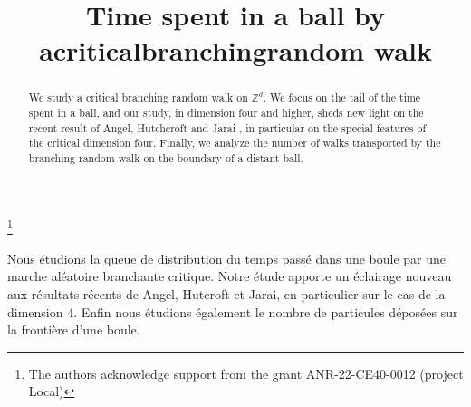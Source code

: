 \documentclass[JEP,XML,SOM,Unicode,NoFloatCountersInSection,published]{cedram}
\theoremstyle{plain}
\theoremstyle{definition}
\newcommand{\1}{{\text{\Large $\mathfrak 1$}}}
\begin{document}
\frontmatter
\title{Time spent in a ball by a\nobreakspace critical\nobreakspace branching\nobreakspace random walk}

\author[\initial{A.} \lastname{Asselah}]{ }
\address{LAMA, Univ Paris Est Créteil, Univ Gustave Eiffel, UPEM, CNRS,\\
F-94010, Créteil, France\\
\& New York University at Shanghai}

\author[\initial{B.} \lastname{Schapira}]{ }
\address{Aix-Marseille Université, I2M, CNRS UMR 7373,\\
13453 Marseille, France\\
\& Université Lyon 1, Institut Camille Jordan, CNRS UMR 5208}
\urladdr{}

\thanks{The authors acknowledge support from the grant ANR-22-CE40-0012 (project Local)}

\begin{abstract}
We study a critical branching random walk on $\mathbb{Z}^d$. We focus on the tail of the time spent in a ball, and our study, in dimension four and higher, sheds new light on the recent result of Angel, Hutchcroft and Jarai , in particular on the special features of the critical dimension four. Finally, we analyze the number of walks transported by the branching random walk on the boundary of a distant ball.
\end{abstract}





\begin{altabstract}
Nous étudions la queue de distribution du temps passé dans une boule par une marche aléatoire branchante critique. Notre étude apporte un éclairage nouveau aux résultats récents de Angel, Hutcroft et Jarai, en particulier sur le cas de la dimension 4. Enfin nous étudions également le nombre de particules déposées sur la frontière d’une boule.
\end{altabstract}

\maketitle
\vspace*{-\baselineskip}
\tableofcontents
\mainmatter
\end{document}
